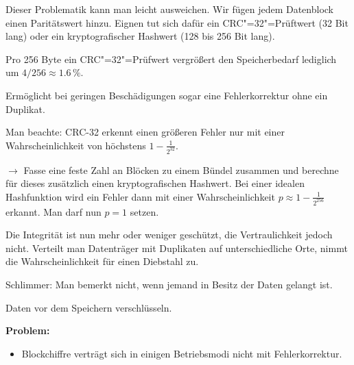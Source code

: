 \documentclass{beamer}
\newcommand{\strong}[1]{\textsf{\textbf{#1}}}
\begin{document}
\begin{frame}[t]
\vspace{2em}
Dieser Problematik kann man leicht ausweichen. Wir fügen jedem
Datenblock einen Paritätswert hinzu. Eignen tut sich dafür ein
CRC"=32"=Prüftwert (32 Bit lang) oder ein kryptografischer
Hashwert (128 bis 256 Bit lang).\pause

\vspace{1em}
Pro 256 Byte ein CRC"=32"=Prüfwert vergrößert den Speicherbedarf
lediglich um $4/256 \approx 1.6\,\%$.\pause

\vspace{1em}
Ermöglicht bei geringen Beschädigungen sogar eine
Fehlerkorrektur ohne ein Duplikat.
\end{frame}

\begin{frame}[t]
\vspace{2em}
Man beachte: CRC-32 erkennt einen größeren Fehler nur mit einer
Wahrscheinlichkeit von höchstens $1-\tfrac{1}{2^{32}}$.\pause

\vspace{1em}
$\rightarrow$ Fasse eine feste Zahl an Blöcken zu einem Bündel
zusammen und berechne für dieses zusätzlich einen kryptografischen
Hashwert. Bei einer idealen Hashfunktion wird ein Fehler dann mit einer
Wahrscheinlichkeit $p\approx 1-\tfrac{1}{2^{256}}$ erkannt. Man darf
nun $p=1$ setzen.
\end{frame}

\begin{frame}
Die Integrität ist nun mehr oder weniger geschützt, die
Vertraulichkeit jedoch nicht. Verteilt man Datenträger mit Duplikaten
auf unterschiedliche Orte, nimmt die Wahrscheinlichkeit für einen
Diebstahl zu.\pause

\vspace{1em}
Schlimmer: Man bemerkt nicht, wenn jemand in Besitz der Daten
gelangt ist.
\end{frame}

\begin{frame}[t]
\vspace{3em}
Daten vor dem Speichern verschlüsseln.\pause

\vspace{1em}
\strong{Problem:}
\begin{itemize}
\item Blockchiffre verträgt sich in einigen Betriebsmodi
  nicht mit Fehlerkorrektur.
\end{itemize}
\end{frame}
\end{document}
